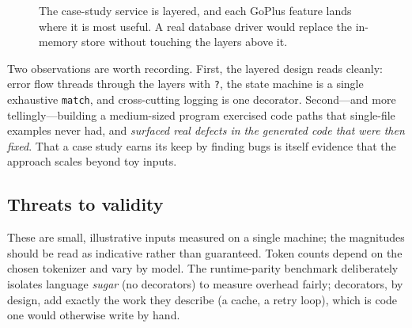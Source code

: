 \documentclass[11pt,a4paper]{article}
\begin{document}
\begin{figure}[ht]
\centering
{}
\caption{The case-study service is layered, and each GoPlus feature lands where it
is most useful. A real database driver would replace the in-memory store without
touching the layers above it.}
\label{fig:casestudy}
\end{figure}

Two observations are worth recording. First, the layered design reads cleanly:
error flow threads through the layers with \texttt{?}, the state machine is a
single exhaustive \texttt{match}, and cross-cutting logging is one decorator.
Second---and more tellingly---building a medium-sized program exercised code
paths that single-file examples never had, and \emph{surfaced real defects in the
generated code that were then fixed}. That a case study earns its keep by finding
bugs is itself evidence that the approach scales beyond toy inputs.

\subsection{Threats to validity}
These are small, illustrative inputs measured on a single machine; the magnitudes
should be read as indicative rather than guaranteed. Token counts depend on the
chosen tokenizer and vary by model. The runtime-parity benchmark deliberately
isolates language \emph{sugar} (no decorators) to measure overhead fairly;
decorators, by design, add exactly the work they describe (a cache, a retry
loop), which is code one would otherwise write by hand.
\end{document}

